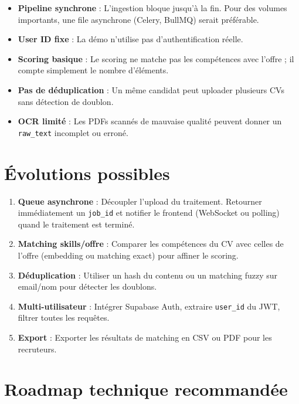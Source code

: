 \documentclass[11pt,a4paper]{report}
\begin{document}
\begin{itemize}[leftmargin=*]
  \item \textbf{Pipeline synchrone} : L'ingestion bloque jusqu'à la fin. Pour des volumes importants, une file asynchrone (Celery, BullMQ) serait préférable.
  \item \textbf{User ID fixe} : La démo n'utilise pas d'authentification réelle.
  \item \textbf{Scoring basique} : Le scoring ne matche pas les compétences avec l'offre ; il compte simplement le nombre d'éléments.
  \item \textbf{Pas de déduplication} : Un même candidat peut uploader plusieurs CVs sans détection de doublon.
  \item \textbf{OCR limité} : Les PDFs scannés de mauvaise qualité peuvent donner un \texttt{raw\_text} incomplet ou erroné.
\end{itemize}

\section{Évolutions possibles}

\begin{enumerate}[leftmargin=*]
  \item \textbf{Queue asynchrone} : Découpler l'upload du traitement. Retourner immédiatement un \texttt{job\_id} et notifier le frontend (WebSocket ou polling) quand le traitement est terminé.
  \item \textbf{Matching skills/offre} : Comparer les compétences du CV avec celles de l'offre (embedding ou matching exact) pour affiner le scoring.
  \item \textbf{Déduplication} : Utiliser un hash du contenu ou un matching fuzzy sur email/nom pour détecter les doublons.
  \item \textbf{Multi-utilisateur} : Intégrer Supabase Auth, extraire \texttt{user\_id} du JWT, filtrer toutes les requêtes.
  \item \textbf{Export} : Exporter les résultats de matching en CSV ou PDF pour les recruteurs.
\end{enumerate}

\section{Roadmap technique recommandée}
\end{document}
